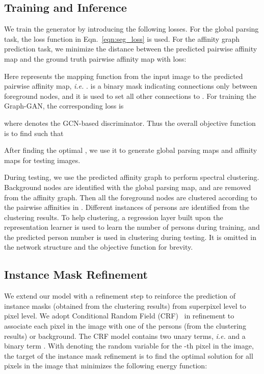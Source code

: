 \documentclass[10pt, letterpaper]{article}
\begin{document}
\subsection{Training and Inference}
We train the generator by introducing the following losses. For the global parsing task, the loss function in Eqn.~\eqref{eqn:seg_loss} is used. For the affinity graph prediction task, we minimize the distance between the predicted pairwise affinity map  and the ground truth pairwise affinity map  with  loss:

Here  represents the mapping function from the input image  to the predicted pairwise affinity map, \emph{i.e.} .  is a binary mask indicating connections only between foreground nodes, and it is used to set all other connections to . For training the Graph-GAN, the corresponding loss is

where  denotes the GCN-based  discriminator. Thus the overall objective function is to find  such that

After finding the optimal , we  use it to generate global parsing maps and affinity maps for testing images. 

During testing, we use the predicted affinity graph  to perform spectral clustering. Background nodes are identified with the global parsing map, and are removed from the affinity graph. Then all the foreground nodes are clustered according to the pairwise affinities in . Different instances of persons are identified from the clustering results. To help clustering, a regression layer built upon the representation learner is used to learn the number of persons during training, and the predicted person number is used in clustering during testing. It is omitted in the network structure and the objective function for brevity. 

\subsection{Instance Mask Refinement }
We extend our model with a refinement step to reinforce the prediction of instance masks (obtained from the clustering results) from superpixel level to pixel level. We adopt Conditional Random Field (CRF)~\cite{lafferty2001conditional} in refinement to associate each pixel in the image with one of the persons (from the clustering results) or background. The CRF model contains two  unary terms, \emph{i.e.}  and a binary term . With  denoting  the random variable for the -th pixel in the image, the target of the instance mask refinement is to find the optimal solution  for all pixels in the image that minimizes the following energy function:
\end{document}
